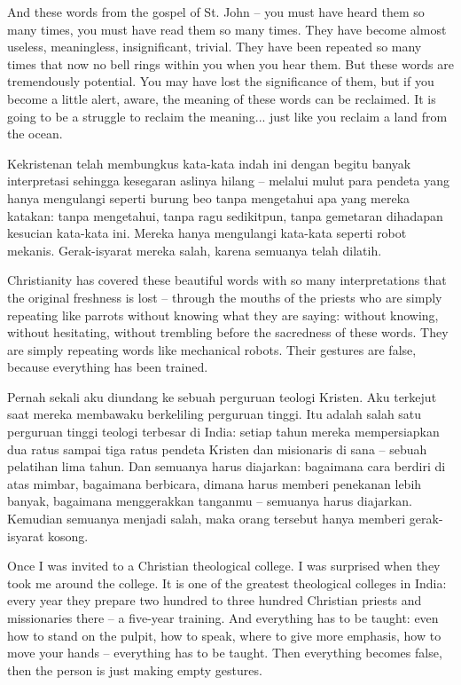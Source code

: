 \english
And these words from the gospel of St. John -- you must have heard them so many times, you must have read them so many times. They have become almost useless, meaningless, insignificant, trivial. They have been repeated so many times that now no bell rings within you when you hear them. But these words are tremendously potential. You may have lost the significance of them, but if you become a little alert, aware, the meaning of these words can be reclaimed. It is going to be a struggle to reclaim the meaning... just like you reclaim a land from the ocean.

\bahasa
Kekristenan telah membungkus kata-kata indah ini dengan begitu banyak interpretasi sehingga kesegaran aslinya hilang -- melalui mulut para pendeta yang hanya mengulangi seperti burung beo tanpa mengetahui apa yang mereka katakan: tanpa mengetahui, tanpa ragu sedikitpun, tanpa gemetaran dihadapan kesucian kata-kata ini. Mereka hanya mengulangi kata-kata seperti robot mekanis. Gerak-isyarat mereka salah, karena semuanya telah dilatih.

\english
Christianity has covered these beautiful words with so many interpretations that the original freshness is lost -- through the mouths of the priests who are simply repeating like parrots without knowing what they are saying: without knowing, without hesitating, without trembling before the sacredness of these words. They are simply repeating words like mechanical robots. Their gestures are false, because everything has been trained.

\bahasa
Pernah sekali aku diundang ke sebuah perguruan teologi Kristen. Aku terkejut saat mereka membawaku berkeliling perguruan tinggi. Itu adalah salah satu perguruan tinggi teologi terbesar di India: setiap tahun mereka mempersiapkan dua ratus sampai tiga ratus pendeta Kristen dan misionaris di sana -- sebuah pelatihan lima tahun. Dan semuanya harus diajarkan: bagaimana cara berdiri di atas mimbar, bagaimana berbicara, dimana harus memberi penekanan lebih banyak, bagaimana menggerakkan tanganmu -- semuanya harus diajarkan. Kemudian semuanya menjadi salah, maka orang tersebut hanya memberi gerak-isyarat kosong.

\english
Once I was invited to a Christian theological college. I was surprised when they took me around the college. It is one of the greatest theological colleges in India: every year they prepare two hundred to three hundred Christian priests and missionaries there -- a five-year training. And everything has to be taught: even how to stand on the pulpit, how to speak, where to give more emphasis, how to move your hands -- everything has to be taught. Then everything becomes false, then the person is just making empty gestures.

